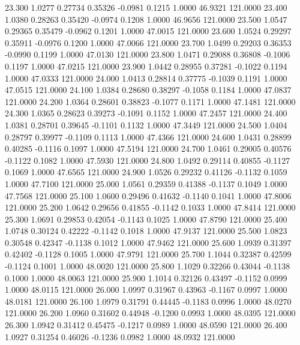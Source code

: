   23.300   1.0277   0.27734   0.35326  -0.0981   0.1215   1.0000  46.9321 121.0000
  23.400   1.0380   0.28263   0.35420  -0.0974   0.1208   1.0000  46.9656 121.0000
  23.500   1.0547   0.29365   0.35479  -0.0962   0.1201   1.0000  47.0015 121.0000
  23.600   1.0524   0.29297   0.35911  -0.0976   0.1200   1.0000  47.0066 121.0000
  23.700   1.0499   0.29203   0.36353  -0.0990   0.1199   1.0000  47.0130 121.0000
  23.800   1.0471   0.29088   0.36808  -0.1006   0.1197   1.0000  47.0215 121.0000
  23.900   1.0442   0.28955   0.37281  -0.1022   0.1194   1.0000  47.0333 121.0000
  24.000   1.0413   0.28814   0.37775  -0.1039   0.1191   1.0000  47.0515 121.0000
  24.100   1.0384   0.28680   0.38297  -0.1058   0.1184   1.0000  47.0837 121.0000
  24.200   1.0364   0.28601   0.38823  -0.1077   0.1171   1.0000  47.1481 121.0000
  24.300   1.0365   0.28623   0.39273  -0.1091   0.1152   1.0000  47.2457 121.0000
  24.400   1.0381   0.28701   0.39645  -0.1101   0.1132   1.0000  47.3449 121.0000
  24.500   1.0404   0.28797   0.39977  -0.1109   0.1113   1.0000  47.4366 121.0000
  24.600   1.0431   0.28899   0.40285  -0.1116   0.1097   1.0000  47.5194 121.0000
  24.700   1.0461   0.29005   0.40576  -0.1122   0.1082   1.0000  47.5930 121.0000
  24.800   1.0492   0.29114   0.40855  -0.1127   0.1069   1.0000  47.6565 121.0000
  24.900   1.0526   0.29232   0.41126  -0.1132   0.1059   1.0000  47.7100 121.0000
  25.000   1.0561   0.29359   0.41388  -0.1137   0.1049   1.0000  47.7568 121.0000
  25.100   1.0600   0.29496   0.41632  -0.1140   0.1041   1.0000  47.8006 121.0000
  25.200   1.0642   0.29656   0.41855  -0.1142   0.1033   1.0000  47.8414 121.0000
  25.300   1.0691   0.29853   0.42054  -0.1143   0.1025   1.0000  47.8790 121.0000
  25.400   1.0748   0.30124   0.42222  -0.1142   0.1018   1.0000  47.9137 121.0000
  25.500   1.0823   0.30548   0.42347  -0.1138   0.1012   1.0000  47.9462 121.0000
  25.600   1.0939   0.31397   0.42402  -0.1128   0.1005   1.0000  47.9791 121.0000
  25.700   1.1044   0.32387   0.42599  -0.1124   0.1001   1.0000  48.0020 121.0000
  25.800   1.1029   0.32266   0.43044  -0.1138   0.1000   1.0000  48.0063 121.0000
  25.900   1.1014   0.32126   0.43497  -0.1152   0.0999   1.0000  48.0115 121.0000
  26.000   1.0997   0.31967   0.43963  -0.1167   0.0997   1.0000  48.0181 121.0000
  26.100   1.0979   0.31791   0.44445  -0.1183   0.0996   1.0000  48.0270 121.0000
  26.200   1.0960   0.31602   0.44948  -0.1200   0.0993   1.0000  48.0395 121.0000
  26.300   1.0942   0.31412   0.45475  -0.1217   0.0989   1.0000  48.0590 121.0000
  26.400   1.0927   0.31254   0.46026  -0.1236   0.0982   1.0000  48.0932 121.0000
